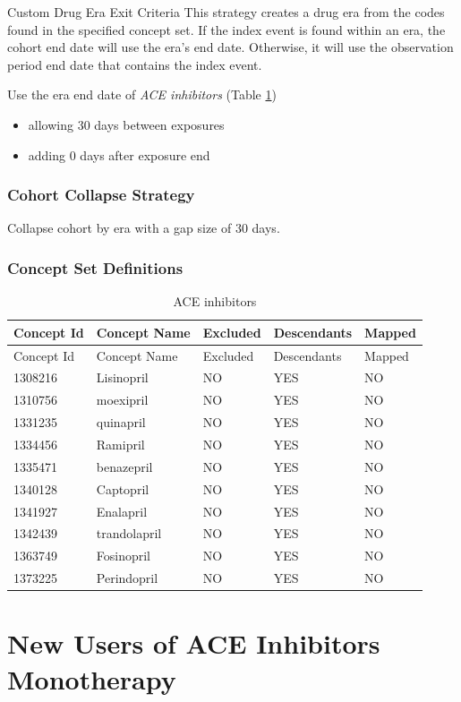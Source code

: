 \documentclass[11pt]{book}
\providecommand{\tightlist}{%
  \setlength{\itemsep}{0pt}\setlength{\parskip}{0pt}}
\theoremstyle{definition}
\theoremstyle{definition}
\theoremstyle{definition}
\theoremstyle{remark}
\begin{document}
Custom Drug Era Exit Criteria This strategy creates a drug era from the
codes found in the specified concept set. If the index event is found
within an era, the cohort end date will use the era's end date.
Otherwise, it will use the observation period end date that contains the
index event.

Use the era end date of \emph{ACE inhibitors} (Table
\ref{tab:aceInhibitors})

\begin{itemize}
\tightlist
\item
  allowing 30 days between exposures
\item
  adding 0 days after exposure end
\end{itemize}

\subsubsection*{Cohort Collapse
Strategy}\label{cohort-collapse-strategy}

Collapse cohort by era with a gap size of 30 days.

\subsubsection*{Concept Set Definitions}\label{concept-set-definitions}

\begin{longtable}[]{@{}lllll@{}}
\caption{\label{tab:aceInhibitors} ACE inhibitors}\tabularnewline
\toprule
Concept Id & Concept Name & Excluded & Descendants &
Mapped\tabularnewline
\midrule
\endfirsthead
\toprule
Concept Id & Concept Name & Excluded & Descendants &
Mapped\tabularnewline
\midrule
\endhead
1308216 & Lisinopril & NO & YES & NO\tabularnewline
1310756 & moexipril & NO & YES & NO\tabularnewline
1331235 & quinapril & NO & YES & NO\tabularnewline
1334456 & Ramipril & NO & YES & NO\tabularnewline
1335471 & benazepril & NO & YES & NO\tabularnewline
1340128 & Captopril & NO & YES & NO\tabularnewline
1341927 & Enalapril & NO & YES & NO\tabularnewline
1342439 & trandolapril & NO & YES & NO\tabularnewline
1363749 & Fosinopril & NO & YES & NO\tabularnewline
1373225 & Perindopril & NO & YES & NO\tabularnewline
\bottomrule
\end{longtable}

\section{New Users of ACE Inhibitors
Monotherapy}\label{AceInhibitorsMono}
\end{document}
